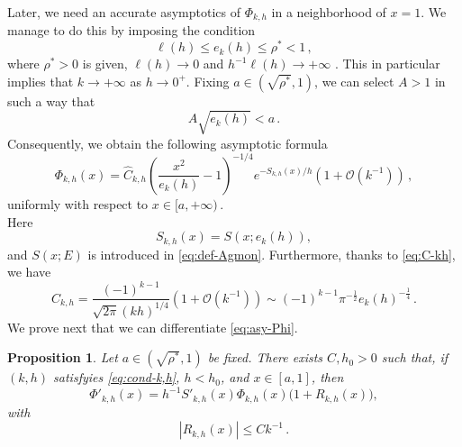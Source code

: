 \documentclass[11pt]{amsart}
\numberwithin{equation}{section}
\newtheorem{proposition}[theorem]{Proposition}
\theoremstyle{remark}
\begin{document}
Later, we need an accurate asymptotics of $\Phi_{k,h}$ in a neighborhood of $x=1$. We manage to do this by imposing the condition
\begin{equation}\label{eq:cond-k,h}
\ell(h)\leq e_k(h)\leq \rho^*<1\,,
\end{equation}
where $\rho^*>0$ is given, $\ell(h)\to0$ and $h^{-1}\ell(h)\to+\infty$ .  This in particular implies that $k\to+\infty$ as $h\to0^+$. Fixing  $a\in(\sqrt{\rho^*},1)$, we can select $A>1$ in such a way that
\[A\sqrt{e_k(h)}<a\,. \]
Consequently, we obtain the following asymptotic formula
    \begin{equation}\label{eq:asy-Phi}
\Phi_{k,h}(x)
    		=
    		\hat C_{k,h}
    		\left(\frac{x^2}{e_k(h)}-1\right)^{-1/4}
    		e^{-S_{k,h}(x)/h}
    		\left(1+\mathcal O(k^{-1})\right)\,,
    \end{equation}
uniformly with respect to $x\in[a,+\infty)\,$. \\
Here
    \begin{equation}\label{eq:def-S-kh}
    S_{k,h}(x)=S(x;e_k(h)),
    \end{equation} and $S(x;E)$ is introduced in \eqref{eq:def-Agmon}. Furthermore, thanks to \eqref{eq:C-kh}, we have
\begin{equation}\label{eq:def-hat-C-kh}
\hat C_{k,h}= \frac{(-1)^{k-1}}{\sqrt{2\pi} (kh)^{1/4}} (1+\mathcal O(k^{-1}))
\sim (-1)^{k-1}\pi^{-\frac12}e_k(h)^{-\frac{1}{4}}\,.
\end{equation}
%
We prove next that we can differentiate \eqref{eq:asy-Phi}.
%
\begin{proposition}\label{prop:asy-Phi}
%
Let $a\in(\sqrt{\rho^*},1)$ be fixed. There exists $C,h_0>0$ such that,   if $(k,h)$ satisfyies \eqref{eq:cond-k,h},  $h<h_0$, and $x\in[a,1]$, then 
\[\Phi'_{k,h}(x)=h^{-1}S'_{k,h}(x)\Phi_{k,h}(x)\bigl(1+R_{k,h}(x)\bigr),\]
with
\[|R_{k,h}(x)|\leq C k^{-1}\,.\]
\end{proposition}
%
\end{document}
